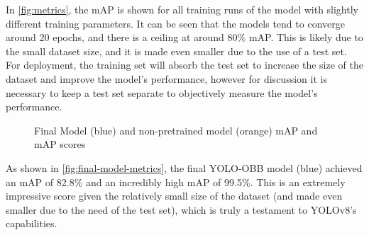 In \autoref{fig:metrics}, the mAP is shown for all training runs of the model with slightly different training parameters. It can be seen that the models tend to converge around 20 epochs, and there is a ceiling at around 80\% mAP. This is likely due to the small dataset size, and it is made even smaller due to the use of a test set. For deployment, the training set will absorb the test set to increase the size of the dataset and improve the model's performance, however for discussion it is necessary to keep a test set separate to objectively measure the model's performance.


\begin{figure}[H]
  \centering
  \begin{minipage}[t]{0.8\textwidth}
    \centering
    
  \end{minipage}
  \par\medskip
  \begin{minipage}[t]{0.8\textwidth}
    \centering
    
  \end{minipage}
  \caption{Final Model (blue) and non-pretrained model (orange) mAP and mAP scores}
  \label{fig:final-model-metrics}
\end{figure}

As shown in \autoref{fig:final-model-metrics}, the final YOLO-OBB model (blue) achieved an mAP of 82.8\% and an incredibly high mAP of 99.5\%. This is an extremely impressive score given the relatively small size of the dataset (and made even smaller due to the need of the test set), which is truly a testament to YOLOv8's capabilities.


